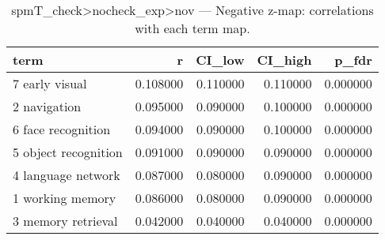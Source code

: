 \begin{table}
\caption{spmT_check>nocheck_exp>nov — Negative z-map: correlations with each term map.}
\label{tab:spmT_check>nocheck_exp>nov_neg}
\begin{tabular}{lrrrr}
\toprule
term & r & CI\_low & CI\_high & p\_fdr \\
\midrule
7 early visual & 0.108000 & 0.110000 & 0.110000 & 0.000000 \\
2 navigation & 0.095000 & 0.090000 & 0.100000 & 0.000000 \\
6 face recognition & 0.094000 & 0.090000 & 0.100000 & 0.000000 \\
5 object recognition & 0.091000 & 0.090000 & 0.090000 & 0.000000 \\
4 language network & 0.087000 & 0.080000 & 0.090000 & 0.000000 \\
1 working memory & 0.086000 & 0.080000 & 0.090000 & 0.000000 \\
3 memory retrieval & 0.042000 & 0.040000 & 0.040000 & 0.000000 \\
\bottomrule
\end{tabular}
\end{table}
